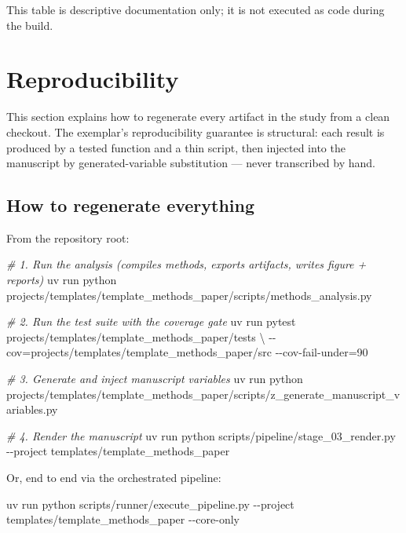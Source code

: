 \documentclass[
  english,
]{article}
\newenvironment{Shaded}{}{}
\newcommand{\AttributeTok}[1]{\textcolor[rgb]{0.49,0.56,0.16}{#1}}
\newcommand{\CommentTok}[1]{\textcolor[rgb]{0.38,0.63,0.69}{\textit{#1}}}
\newcommand{\DataTypeTok}[1]{\textcolor[rgb]{0.56,0.13,0.00}{#1}}
\newcommand{\ExtensionTok}[1]{#1}
\newcommand{\NormalTok}[1]{#1}
\newcommand{\OperatorTok}[1]{\textcolor[rgb]{0.40,0.40,0.40}{#1}}
\begin{document}
This table is descriptive documentation only; it is not executed as code
during the build.

\newpage

\section{Reproducibility}\label{sec:reproducibility}

This section explains how to regenerate every artifact in the study from
a clean checkout. The exemplar's reproducibility guarantee is
structural: each result is produced by a tested function and a thin
script, then injected into the manuscript by generated-variable
substitution --- never transcribed by hand.

\subsection{How to regenerate
everything}\label{how-to-regenerate-everything}

From the repository root:

\begin{Shaded}
\begin{Highlighting}[]
\CommentTok{\# 1. Run the analysis (compiles methods, exports artifacts, writes figure + reports)}
\ExtensionTok{uv}\NormalTok{ run python projects/templates/template\_methods\_paper/scripts/methods\_analysis.py}

\CommentTok{\# 2. Run the test suite with the coverage gate}
\ExtensionTok{uv}\NormalTok{ run pytest projects/templates/template\_methods\_paper/tests }\DataTypeTok{\textbackslash{}}
    \AttributeTok{{-}{-}cov}\OperatorTok{=}\NormalTok{projects/templates/template\_methods\_paper/src }\AttributeTok{{-}{-}cov{-}fail{-}under}\OperatorTok{=}\NormalTok{90}

\CommentTok{\# 3. Generate and inject manuscript variables}
\ExtensionTok{uv}\NormalTok{ run python projects/templates/template\_methods\_paper/scripts/z\_generate\_manuscript\_variables.py}

\CommentTok{\# 4. Render the manuscript}
\ExtensionTok{uv}\NormalTok{ run python scripts/pipeline/stage\_03\_render.py }\AttributeTok{{-}{-}project}\NormalTok{ templates/template\_methods\_paper}
\end{Highlighting}
\end{Shaded}

Or, end to end via the orchestrated pipeline:

\begin{Shaded}
\begin{Highlighting}[]
\ExtensionTok{uv}\NormalTok{ run python scripts/runner/execute\_pipeline.py }\AttributeTok{{-}{-}project}\NormalTok{ templates/template\_methods\_paper }\AttributeTok{{-}{-}core{-}only}
\end{Highlighting}
\end{Shaded}
\end{document}
